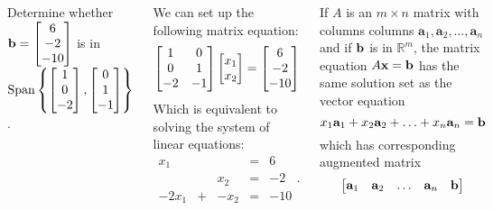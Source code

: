 \documentclass[xcolor=dvipsnames,aspectratio=169,t]{beamer}
\begin{document}
\begin{frame}

  \begin{columns}[T]

    \column{0.5\tw}
{\footnotesize
    \bbox
    Determine whether  $\displaystyle \mathbf{b} = \begin{bmatrix} 6 \\ -2 \\ -10 \end{bmatrix}$  is in $ \mbox{Span} \left\{ \begin{bmatrix} 1 \\ 0 \\ -2  \end{bmatrix},  \begin{bmatrix} 0 \\ 1 \\ -1  \end{bmatrix} \right\}$.
    \ebox
    
We can set up the following matrix equation:  
 \[  \begin{bmatrix} 1 & 0 \\ 0 & 1 \\ -2 & -1 \end{bmatrix} \begin{bmatrix} x_1 \\ x_2 \end{bmatrix} =  \begin{bmatrix} 6 \\ -2 \\ -10 \end{bmatrix} \]
 Which is equivalent to solving the system of linear equations:
 \[ \begin{array}{ccccc}
   x_1 &  &  & = & 6 \\
        &  & x_2 & = & -2 \\
   -2x_1 & + & -x_2 &=&-10
 \end{array}.
 \] }

 
 \column{0.5\tw}

 
 \bbox
 If $A$ is an $m \times n$ matrix with columns columns $\mathbf{a}_1, \mathbf{a}_2, \ldots , \mathbf{a}_n$ and if $\mathbf{b}$ is in $\mathbb{R}^m$, the matrix equation $A\mathbf{x} = \mathbf{b}$ has the same solution set as the vector equation
   \[ x_1  \mathbf{a}_1 + x_2  \mathbf{a}_2  + \ldots + x_n  \mathbf{a}_n = \mathbf{b} \]
   which has corresponding augmented matrix
   \[ \begin{bmatrix} \mathbf{a}_1 & \mathbf{a}_2 & \ldots & \mathbf{a}_n & \mathbf{b} \end{bmatrix} \]
   \ebox
   
\end{columns}
 
 \end{frame}
\end{document}
